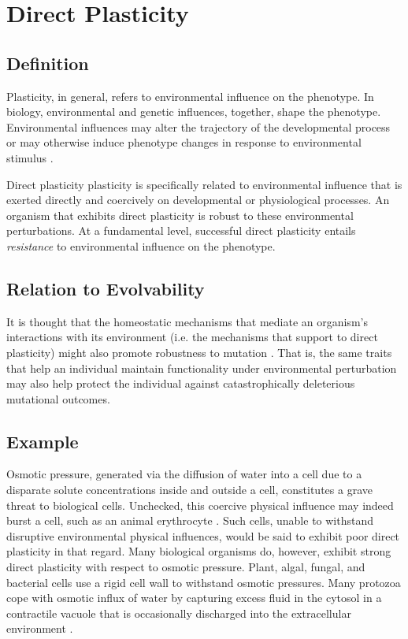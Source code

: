 \section{Direct Plasticity} \label{sec:direct_plasticity}
\subsection{Definition}
Plasticity, in general, refers to environmental influence on the phenotype. In biology, environmental and genetic influences, together, shape the phenotype. Environmental influences may alter the trajectory of the developmental process or may otherwise induce phenotype changes in response to environmental stimulus \cite{Fusco2010PhenotypicConcepts}.

Direct plasticity plasticity is specifically related to environmental influence that is exerted directly and coercively on developmental or physiological processes. An organism that exhibits direct plasticity is robust to these environmental perturbations. At a fundamental level, successful direct plasticity entails \textit{resistance} to environmental influence on the phenotype.


\subsection{Relation to Evolvability}

It is thought that the homeostatic mechanisms that mediate an organism's interactions with its environment (i.e. the mechanisms that support to direct plasticity) might also promote robustness to mutation \cite{Moczek2011TheInnovation}. That is, the same traits that help an individual maintain functionality under environmental perturbation may also help protect the individual against catastrophically deleterious mutational outcomes.

\subsection{Example}
Osmotic pressure, generated via the diffusion of water into a cell due to a disparate solute concentrations inside and outside a cell, constitutes a grave threat to biological cells.
Unchecked, this coercive physical influence may indeed burst a cell, such as an animal erythrocyte \cite{Lodish2000OsmosisVolume}.
Such cells, unable to withstand disruptive environmental physical influences, would be said to exhibit poor direct plasticity in that regard.
Many biological organisms do, however, exhibit strong direct plasticity with respect to osmotic pressure.
Plant, algal, fungal, and bacterial cells use a rigid cell wall to withstand osmotic pressures.
Many protozoa cope with osmotic influx of water by capturing excess fluid in the cytosol in a contractile vacuole  that is occasionally discharged into the extracellular environment \cite{Lodish2000OsmosisVolume}.

